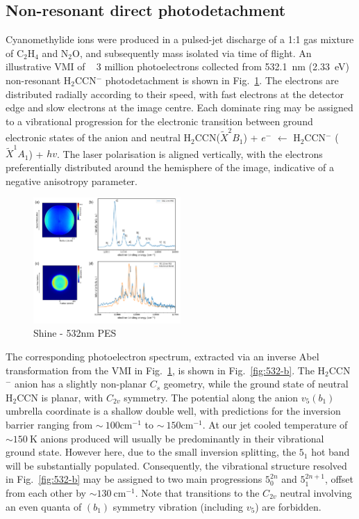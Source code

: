 \documentclass[journal=jpcafh,manuscript=article,layout=onecolumn, 12pt]{achemso}
\begin{document}
\subsection{Non-resonant direct photodetachment}
Cyanomethylide ions were produced in a pulsed-jet discharge of a 1:1 gas mixture of C$_2$H$_4$ and N$_2$O, and subsequently mass isolated via time of flight. An illustrative VMI of ~ 3 million photoelectrons collected from 532.1~nm (2.33~eV) non-resonant H$_2$CCN$^-$ photodetachment is shown in Fig.~\ref{fig:532}. The electrons are distributed radially according to their speed, with fast electrons at the detector edge and slow electrons at the image centre. Each dominate ring may be assigned to a vibrational progression for the electronic transition between ground electronic states of the anion and neutral H$_2$CCN($\tilde{X}^2B_1$) + $e^-$ $\leftarrow$ H$_2$CCN$^-$ ($\tilde{X}^1A_1$) + $hv$. The laser polarisation is aligned vertically, with the electrons preferentially distributed around the hemisphere of the image, indicative of a negative anisotropy parameter.

\begin{figure}
	\includegraphics[width=0.5\textwidth]{figures/Fig1}
	\caption{Shine - 532nm PES}
	\label{fig:532}
\end{figure}

The corresponding photoelectron spectrum, extracted via an inverse Abel transformation from the VMI in Fig.~\ref{fig:532}, is shown in Fig.~\ref{fig:532-b}. The H$_2$CCN$^-$ anion has a slightly non-planar $C_s$ geometry, while the ground state of neutral H$_2$CCN is planar, with $C_{2v}$ symmetry. The potential along the anion $v_5 (b_1)$ umbrella coordinate is a shallow double well, with predictions for the inversion barrier ranging from $\sim~100$cm$^{-1}$ to $\sim~150$cm$^{-1}$. At our jet cooled temperature of $\sim150~$K anions produced will usually be predominantly in their vibrational ground state. However here, due to the small inversion splitting, the $5_1$ hot band will be substantially populated. Consequently, the vibrational structure resolved in Fig.~\ref{fig:532-b} may be assigned to two main progressions $5_0^{2n}$ and $5_1^{2n+1}$, offset from each other by $\sim130~$cm$^{-1}$. Note that transitions to the $C_{2v}$ neutral involving an even quanta of $(b_1)$ symmetry vibration (including $v_5$) are forbidden. 
\end{document}
